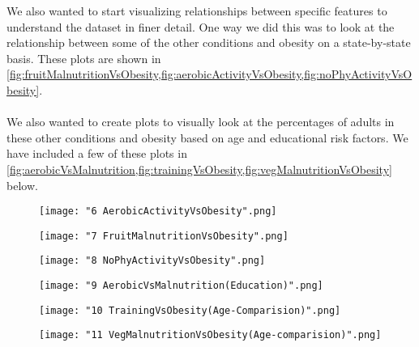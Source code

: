 \documentclass{article}
\begin{document}
		We also wanted to start visualizing relationships between specific features to understand the dataset in finer detail. One way we did this was to look at the relationship between some of the other conditions and obesity on a state-by-state basis. These plots are shown in \cref{fig:fruitMalnutritionVsObesity,fig:aerobicActivityVsObesity,fig:noPhyActivityVsObesity}. 
		\\\\
		We also wanted to create plots to visually look at the percentages of adults in these other conditions and obesity based on age and educational risk factors. We have included a few of these plots in \cref{fig:aerobicVsMalnutrition,fig:trainingVsObesity,fig:vegMalnutritionVsObesity} below.
		\begin{figure}[h]
			\centering
			\caption{}
			\texttt{[image: "6 AerobicActivityVsObesity".png]}
			\label{fig:aerobicActivityVsObesity}
		\end{figure}
		\begin{figure}[h]
			\centering
			\caption{}
			\texttt{[image: "7 FruitMalnutritionVsObesity".png]}
			\label{fig:fruitMalnutritionVsObesity}
		\end{figure}
		\begin{figure}[h]
			\centering
			\caption{}
			\texttt{[image: "8 NoPhyActivityVsObesity".png]}
			\label{fig:noPhyActivityVsObesity}
		\end{figure}
		\begin{figure}[h]
			\centering
			\caption{}
			\texttt{[image: "9 AerobicVsMalnutrition(Education)".png]}
			\label{fig:aerobicVsMalnutrition}
		\end{figure}
		\begin{figure}[h]
			\centering
			\caption{}
			\texttt{[image: "10 TrainingVsObesity(Age-Comparision)".png]}
			\label{fig:trainingVsObesity}
		\end{figure}
		\begin{figure}[h]
			\centering
			\caption{}
			\texttt{[image: "11 VegMalnutritionVsObesity(Age-comparision)".png]}
			\label{fig:vegMalnutritionVsObesity}
		\end{figure}
		
\end{document}
